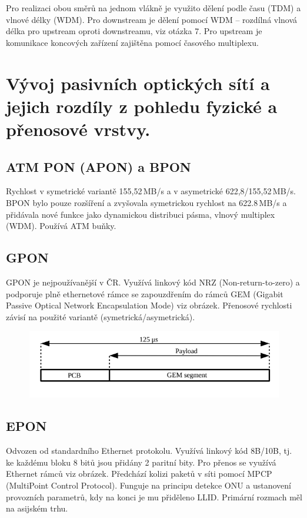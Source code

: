 Pro realizaci obou směrů na jednom vlákně je využito dělení podle času (TDM) a vlnové délky (WDM). Pro downstream je dělení pomocí WDM -- rozdílná vlnová délka pro upstream oproti downstreamu, viz otázka 7. Pro upstream je komunikace koncových zařízení zajištěna pomocí časového multiplexu.

\clearpage
\section{Vývoj pasivních optických sítí a jejich rozdíly z pohledu fyzické a přenosové vrstvy.}

\subsection{ATM PON (APON) a BPON}
Rychlost v symetrické variantě 155,52\,MB/s a v asymetrické 622,8/155,52\,MB/s. BPON bylo pouze rozšíření a zvyšovala symetrickou rychlost na 622.8\,MB/s a přidávala nové funkce jako dynamickou distribuci pásma, vlnový multiplex (WDM). Používá ATM buňky.

\subsection{GPON}
GPON je nejpoužívanější v ČR. Využívá linkový kód NRZ (Non-return-to-zero) a podporuje plně ethernetové rámce se zapouzdřením do rámců GEM (Gigabit Passive Optical Network Encapsulation Mode) viz obrázek. Přenosové rychlosti závisí na použité variantě (symetrická/asymetrická).

\begin{figure} [h]
    \centering
    \includegraphics[width=\textwidth]{snimky/gemFrame.png}
\end{figure}

\subsection{EPON}
Odvozen od standardního Ethernet protokolu. Využívá linkový kód 8B/10B, tj. ke každému bloku 8 bitů jsou přidány 2 paritní bity. Pro přenos se využívá Ethernet rámců viz obrázek. Předchází kolizi paketů v síti pomocí MPCP (MultiPoint Control Protocol). Funguje na principu detekce ONU a ustanovení provozních parametrů, kdy na konci je mu přiděleno LLID. Primární rozmach měl na asijském trhu.

